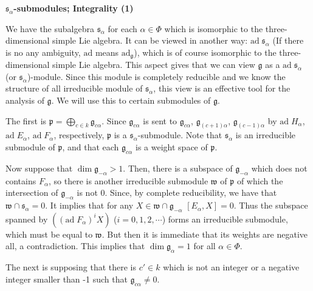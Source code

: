 \documentclass{article}
\newcommand{\lie}[1]{\mathfrak{#1}}
\newcommand{\ad}[1]{\mathrm{ad}\; #1}
\begin{document}
\newpage

\textbf{$\lie{s}_\alpha$-submodules; Integrality (1)}

We have the subalgebra $\lie{s}_\alpha$ for each $\alpha \in \Phi$ which is isomorphic to the three-dimensional simple Lie algebra.
It can be viewed in another way: $\ad{\lie{s}_\alpha}$ (If there is no any ambiguity, $\textrm{ad}$ means $\textrm{ad}_{\lie{g}}$), which is of course isomorphic to the three-dimensional simple Lie algebra.
This aspect gives that we can view $\lie{g}$ as a $\ad{\lie{s}_\alpha}$(or $\lie{s}_\alpha$)-module.
Since this module is completely reducible and we know the structure of all irreducible module of $\lie{s}_\alpha$, this view is an effective tool for the analysis of $\lie{g}$.
We will use this to certain submodules of $\lie{g}$.

The first is $\lie{p} = \bigoplus_{c \in k} \lie{g}_{c\alpha}$.
Since $\lie{g}_{c\alpha}$ is sent to $\lie{g}_{c\alpha}$, $\lie{g}_{(c+1)\alpha}$, $\lie{g}_{(c-1)\alpha}$ by $\ad{H_\alpha}$, $\ad{E_\alpha}$, $\ad{F_\alpha}$, respectively, $\lie{p}$ is a $\lie{s}_\alpha$-submodule.
Note that $\lie{s}_\alpha$ is an irreducible submodule of $\lie{p}$, and that each $\lie{g}_{c\alpha}$ is a weight space of $\lie{p}$.

Now suppose that $\dim{\lie{g}_{-\alpha}} > 1$.
Then, there is a subspace of $\lie{g}_{-\alpha}$ which does not contains $F_\alpha$, so there is another irreducible submodule $\lie{w}$ of $\lie{p}$ of which the intersection of $\lie{g}_{-\alpha}$ is not 0.
Since, by complete reducibility, we have that $\lie{w} \cap \lie{s}_\alpha = 0$.
It implies that for any $X \in \lie{w} \cap \lie{g}_{-\alpha}$ $[E_\alpha, X] = 0$.
Thus the subspace spanned by $((\ad{F_\alpha})^i X)$ ($i = 0, 1, 2, \cdots$) forms an irreducible submodule, which must be equal to $\lie{w}$.
But then it is immediate that its weights are negative all, a contradiction.
This implies that $\dim{\lie{g}_\alpha} = 1$ for all $\alpha \in \Phi$.


The next is supposing that there is  $c' \in k$ which is not an integer or a negative integer smaller than -1 such that $\lie{g}_{c\alpha} \ne 0$.
\end{document}
